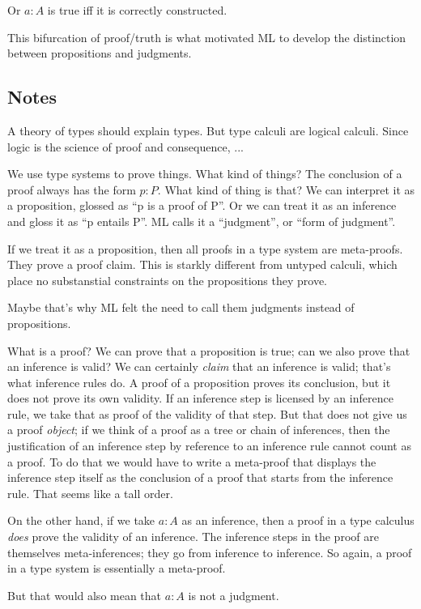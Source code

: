 Or \(a:A\) is true iff it is correctly constructed.


This bifurcation of proof/truth is what motivated ML to develop the
distinction between propositions and judgments.

\subsection{Notes}
A theory of types should explain types. But type calculi are logical
calculi. Since logic is the science of proof and consequence, ...

We use type systems to prove things. What kind of things? The
conclusion of a proof always has the form \(p:P\). What kind of thing
is that? We can interpret it as a proposition, glossed as ``p is a
proof of P''. Or we can treat it as an inference and gloss it as ``p
entails P''. ML calls it a ``judgment'', or ``form of judgment''.

If we treat it as a proposition, then all proofs in a type system are
meta-proofs. They prove a proof claim. This is starkly different from
untyped calculi, which place no substanstial constraints on the
propositions they prove.

Maybe that's why ML felt the need to call them judgments instead of
propositions.

What is a proof? We can prove that a proposition is true; can we also
prove that an inference is valid? We can certainly \textit{claim} that
an inference is valid; that's what inference rules do. A proof of a
proposition proves its conclusion, but it does not prove its own
validity. If an inference step is licensed by an inference rule, we
take that as proof of the validity of that step. But that does not
give us a proof \textit{object}; if we think of a proof as a tree or
chain of inferences, then the justification of an inference step by
reference to an inference rule cannot count as a proof. To do that we
would have to write a meta-proof that displays the inference step
itself as the conclusion of a proof that starts from the inference
rule.  That seems like a tall order.

On the other hand, if we take \(a:A\) as an inference, then a proof in
a type calculus \textit{does} prove the validity of an inference. The
inference steps in the proof are themselves meta-inferences; they go
from inference to inference. So again, a proof in a type system is
essentially a meta-proof.

But that would also mean that \(a:A\) is not a judgment.

